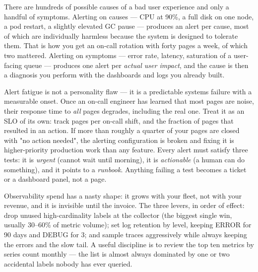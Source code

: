  There are hundreds of possible causes of a bad user experience and only a handful of symptoms. Alerting on causes --- CPU at 90\%, a full disk on one node, a pod restart, a slightly elevated GC pause --- produces an alert per cause, most of which are individually harmless because the system is designed to tolerate them. That is how you get an on-call rotation with forty pages a week, of which two mattered. Alerting on symptoms --- error rate, latency, saturation of a user-facing queue --- produces one alert per \emph{actual user impact}, and the cause is then a diagnosis you perform with the dashboards and logs you already built.

\begin{reliability}
Alert fatigue is not a personality flaw --- it is a predictable systems failure with a measurable onset. Once an on-call engineer has learned that most pages are noise, their response time to \emph{all} pages degrades, including the real one. Treat it as an SLO of its own: track pages per on-call shift, and the fraction of pages that resulted in an action. If more than roughly a quarter of your pages are closed with "no action needed", the alerting configuration is broken and fixing it is higher-priority production work than any feature. Every alert must satisfy three tests: it is \emph{urgent} (cannot wait until morning), it is \emph{actionable} (a human can do something), and it points to a \emph{runbook}. Anything failing a test becomes a ticket or a dashboard panel, not a page.
\end{reliability}

\begin{costnote}
Observability spend has a nasty shape: it grows with your fleet, not with your revenue, and it is invisible until the invoice. The three levers, in order of effect: drop unused high-cardinality labels at the collector (the biggest single win, usually 30--60\% of metric volume); set log retention by level, keeping ERROR for 90 days and DEBUG for 3; and sample traces aggressively while always keeping the errors and the slow tail. A useful discipline is to review the top ten metrics by series count monthly --- the list is almost always dominated by one or two accidental labels nobody has ever queried.
\end{costnote}

